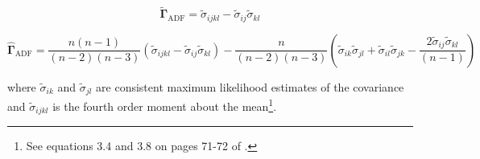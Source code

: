 \begin{equation}
    \label{eq:gammacap-adf}
    \tilde{\boldsymbol{\Gamma}}_{\mathrm{ADF}}
    =
    \tilde{\sigma}_{ijkl}
    -
    \tilde{\sigma}_{ij}
    \tilde{\sigma}_{kl}
\end{equation}

\begin{equation}
    \label{eq:adfunbiased}
    \hat{\boldsymbol{\Gamma}}_{\mathrm{ADF}}
    =
    \frac{
      n
      \left( n - 1 \right)
    }{
      \left( n - 2 \right)
      \left( n - 3 \right)
    }
    \left( 
      \tilde{\sigma}_{ijkl}
      -
      \tilde{\sigma}_{ij}
      \tilde{\sigma}_{kl}    
    \right)
    -
    \frac{
      n
    }{
      \left( n - 2 \right)
      \left( n - 3 \right)
    }
    \left(
      \tilde{\sigma}_{ik}
      \tilde{\sigma}_{jl}  
      +
      \tilde{\sigma}_{il}
      \tilde{\sigma}_{jk}
      -
      \frac{
        2
        \tilde{\sigma}_{ij}
        \tilde{\sigma}_{kl}  
      }{
        \left( n - 1 \right)
      }
    \right)
\end{equation}

\noindent where
$\tilde{\sigma}_{ik}$
and
$\tilde{\sigma}_{jl}$ 
are consistent
maximum likelihood estimates of the covariance
and $\tilde{\sigma}_{ijkl}$ is the fourth order moment about the mean\footnote{
  See equations 3.4 and 3.8 on pages 71-72 of \Textcite{Browne-1984}.
}.
